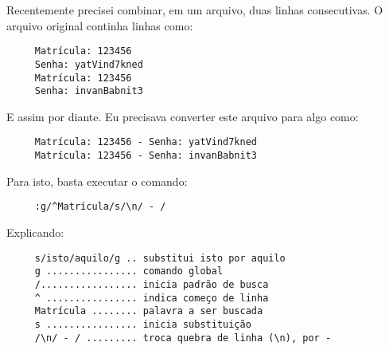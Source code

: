 Recentemente precisei combinar, em um arquivo, duas linhas
consecutivas. O arquivo original continha linhas como:

\begin{verbatim}
     Matrícula: 123456
     Senha: yatVind7kned
     Matrícula: 123456
     Senha: invanBabnit3
\end{verbatim}

E assim por diante. Eu precisava converter este arquivo para algo como:

\begin{verbatim}
     Matrícula: 123456 - Senha: yatVind7kned
     Matrícula: 123456 - Senha: invanBabnit3
\end{verbatim}

Para isto, basta executar o comando:

\begin{verbatim}
     :g/^Matrícula/s/\n/ - /
\end{verbatim}

Explicando:

\begin{verbatim}
     s/isto/aquilo/g .. substitui isto por aquilo
     g ................ comando global
     /................. inicia padrão de busca
     ^ ................ indica começo de linha
     Matrícula ........ palavra a ser buscada
     s ................ inicia substituição
     /\n/ - / ......... troca quebra de linha (\n), por -
\end{verbatim}
